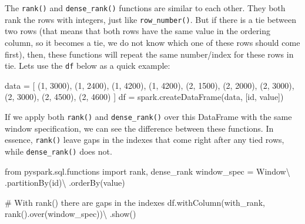 \documentclass[
  11pt,
  letterpaper,
  DIV=11,
  numbers=noendperiod]{scrreprt}
\newenvironment{Shaded}{\begin{snugshade}}{\end{snugshade}}
\newcommand{\CommentTok}[1]{\textcolor[rgb]{0.37,0.37,0.37}{#1}}
\newcommand{\DecValTok}[1]{\textcolor[rgb]{0.68,0.00,0.00}{#1}}
\newcommand{\ImportTok}[1]{\textcolor[rgb]{0.00,0.46,0.62}{#1}}
\newcommand{\NormalTok}[1]{\textcolor[rgb]{0.00,0.23,0.31}{#1}}
\newcommand{\OperatorTok}[1]{\textcolor[rgb]{0.37,0.37,0.37}{#1}}
\newcommand{\StringTok}[1]{\textcolor[rgb]{0.13,0.47,0.30}{#1}}
\begin{document}
The \texttt{rank()} and \texttt{dense\_rank()} functions are similar to
each other. They both rank the rows with integers, just like
\texttt{row\_number()}. But if there is a tie between two rows (that
means that both rows have the same value in the ordering column, so it
becomes a tie, we do not know which one of these rows should come
first), then, these functions will repeat the same number/index for
these rows in tie. Lets use the \texttt{df} below as a quick example:

\begin{Shaded}
\begin{Highlighting}[]
\NormalTok{data }\OperatorTok{=}\NormalTok{ [}
\NormalTok{    (}\DecValTok{1}\NormalTok{, }\DecValTok{3000}\NormalTok{), (}\DecValTok{1}\NormalTok{, }\DecValTok{2400}\NormalTok{),}
\NormalTok{    (}\DecValTok{1}\NormalTok{, }\DecValTok{4200}\NormalTok{), (}\DecValTok{1}\NormalTok{, }\DecValTok{4200}\NormalTok{),}
\NormalTok{    (}\DecValTok{2}\NormalTok{, }\DecValTok{1500}\NormalTok{), (}\DecValTok{2}\NormalTok{, }\DecValTok{2000}\NormalTok{),}
\NormalTok{    (}\DecValTok{2}\NormalTok{, }\DecValTok{3000}\NormalTok{), (}\DecValTok{2}\NormalTok{, }\DecValTok{3000}\NormalTok{),}
\NormalTok{    (}\DecValTok{2}\NormalTok{, }\DecValTok{4500}\NormalTok{), (}\DecValTok{2}\NormalTok{, }\DecValTok{4600}\NormalTok{)}
\NormalTok{]}
\NormalTok{df }\OperatorTok{=}\NormalTok{ spark.createDataFrame(data, [}\StringTok{\textquotesingle{}id\textquotesingle{}}\NormalTok{, }\StringTok{\textquotesingle{}value\textquotesingle{}}\NormalTok{])}
\end{Highlighting}
\end{Shaded}

If we apply both \texttt{rank()} and \texttt{dense\_rank()} over this
DataFrame with the same window specification, we can see the difference
between these functions. In essence, \texttt{rank()} leave gaps in the
indexes that come right after any tied rows, while
\texttt{dense\_rank()} does not.

\begin{Shaded}
\begin{Highlighting}[]
\ImportTok{from}\NormalTok{ pyspark.sql.functions }\ImportTok{import}\NormalTok{ rank, dense\_rank}
\NormalTok{window\_spec }\OperatorTok{=}\NormalTok{ Window}\OperatorTok{\textbackslash{}}
\NormalTok{    .partitionBy(}\StringTok{\textquotesingle{}id\textquotesingle{}}\NormalTok{)}\OperatorTok{\textbackslash{}}
\NormalTok{    .orderBy(}\StringTok{\textquotesingle{}value\textquotesingle{}}\NormalTok{)}

\CommentTok{\# With rank() there are gaps in the indexes}
\NormalTok{df.withColumn(}\StringTok{\textquotesingle{}with\_rank\textquotesingle{}}\NormalTok{, rank().over(window\_spec))}\OperatorTok{\textbackslash{}}
\NormalTok{    .show()}
\end{Highlighting}
\end{Shaded}
\end{document}
